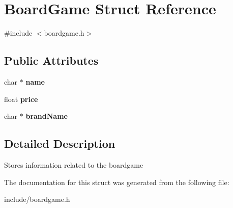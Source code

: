\hypertarget{structBoardGame}{}\section{Board\+Game Struct Reference}
\label{structBoardGame}


{\ttfamily \#include $<$boardgame.\+h$>$}

\subsection*{Public Attributes}
\begin{DoxyCompactItemize}
\item 
\mbox{\label{structBoardGame_ab8e986cafc16af2bc788bd3b5b864eb0}} 
char $\ast$ {\bfseries name}
\item 
\mbox{\label{structBoardGame_a87a290bf7f186468130cf0bc44eb0868}} 
float {\bfseries price}
\item 
\mbox{\label{structBoardGame_aa476f02aa9e8c9f5a262fe87b56a2941}} 
char $\ast$ {\bfseries brand\+Name}
\end{DoxyCompactItemize}


\subsection{Detailed Description}
Stores information related to the boardgame 

The documentation for this struct was generated from the following file\+:\begin{DoxyCompactItemize}
\item 
include/boardgame.\+h\end{DoxyCompactItemize}
